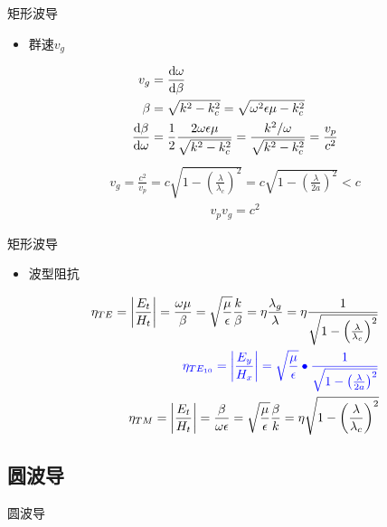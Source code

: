 \begin{frame}{矩形波导}
    \begin{itemize}
        \item 群速$v_g$
    \end{itemize}
    \begin{align*}
        v_g&=\frac{\rm{d}\omega}{\rm{d}\beta}\\
        \beta &= \sqrt{k^2-k_c^2}=\sqrt{\omega^2\epsilon\mu-k_c^2}\\
        \frac{\rm{d}\beta}{\rm{d}\omega}&=\frac{1}{2}\frac{2\omega\epsilon\mu}{\sqrt{k^2-k_c^2}}=\frac{k^2/\omega}{\sqrt{k^2-k_c^2}}=\frac{v_p}{c^2}
    \end{align*}
    \begin{align}
        v_g = \frac{c^2}{v_p}=c\sqrt{1-\left(\frac{\lambda}{\lambda_c}\right)^2}=c\sqrt{1-\left(\frac{\lambda}{2a}\right)^2}<c
    \end{align}
    \begin{align}
        v_p v_g=c^2
    \end{align}
\end{frame}

\begin{frame}{矩形波导}
    \begin{itemize}
        \item 波型阻抗
    \end{itemize}
    \begin{align}
        \eta_{TE}=\left|\frac{E_t}{H_t}\right|=\frac{\omega\mu}{\beta}=\sqrt{\frac{\mu}{\epsilon}}\frac{k}{\beta}=\eta\frac{\lambda_g}{\lambda}=\eta\frac{1}{\sqrt{1-\left(\frac{\lambda}{\lambda_c}\right)^2}}\\
        \color{blue}{\eta_{TE_{10}}=\left|\frac{E_y}{H_x}\right|=\sqrt{\frac{\mu}{\epsilon}}\bullet\frac{1}{\sqrt{1-\left(\frac{\lambda}{2a}\right)^2}}}\\
        \eta_{TM}=\left|\frac{E_t}{H_t}\right|=\frac{\beta}{\omega\epsilon}=\sqrt{\frac{\mu}{\epsilon}}\frac{\beta}{k}=\eta\sqrt{1-\left(\frac{\lambda}{\lambda_c}\right)^2}
    \end{align}
\end{frame}

\subsection{圆波导}
\begin{frame}{圆波导}

\end{frame}

